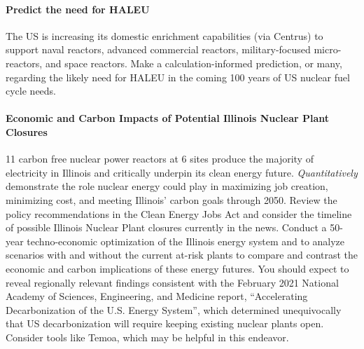 \documentclass[12pts, answers]{exam}
\begin{document}
\paragraph{Predict the need for HALEU}
The US is increasing its domestic enrichment capabilities (via Centrus) to 
support naval reactors, advanced commercial reactors, military-focused 
micro-reactors, and space reactors. Make a calculation-informed prediction, or 
many, regarding the likely need for HALEU in the coming 100 years of US nuclear 
fuel cycle needs.

\paragraph{Economic and Carbon Impacts of Potential Illinois Nuclear Plant Closures} 
11 carbon free nuclear power reactors at 6 sites produce the majority of electricity in Illinois
and critically underpin its clean energy future. \emph{Quantitatively} demonstrate the
role nuclear energy could play in maximizing job creation, minimizing cost, and meeting Illinois’
carbon goals through 2050. Review the policy recommendations in the Clean 
Energy Jobs Act and consider the timeline of possible Illinois Nuclear Plant 
closures currently in the news. Conduct a 50-year techno-economic optimization of
the Illinois energy system and to analyze scenarios with and without the 
current at-risk plants to
compare and contrast the economic and carbon implications of these energy 
futures. You should expect to reveal regionally relevant findings consistent with the February 2021 National
Academy of Sciences, Engineering, and Medicine report, ``Accelerating Decarbonization of the
U.S. Energy System'', which determined unequivocally that US decarbonization will require
keeping existing nuclear plants open. Consider tools like Temoa, which may be 
helpful in this endeavor.
\end{document}
